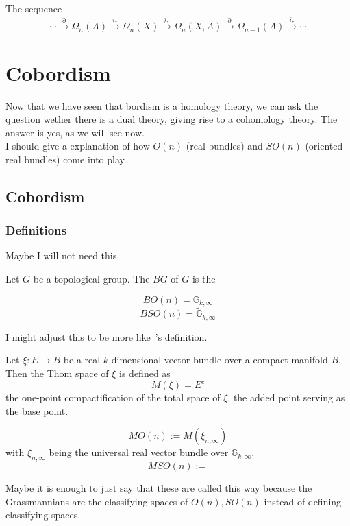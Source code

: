 \documentclass[a4paper,11pt]{article}
\begin{document}
\begin{lemma}
    The sequence
    \[\cdots\xrightarrow{\partial}\Omega_n(A)\xrightarrow{i_\ast}\Omega_n(X)\xrightarrow{j_\ast}\Omega_n(X,A)\xrightarrow{\partial}\Omega_{n-1}(A)\xrightarrow{i_\ast}\cdots\]
\end{lemma}

\section{Cobordism}
Now that we have seen that bordism is a homology theory, we can ask the question wether there is a dual theory, giving rise to a cohomology theory. The answer is yes, as we will see now.\\
I should give a explanation of how \(O(n)\) (real bundles) and \(SO(n)\) (oriented real bundles) come into play.

\subsection{Cobordism}

\subsubsection{Definitions}

Maybe I will not need this
\begin{definition}
    Let \(G\) be a topological group. The  \(BG\) of \(G\) is the 
\end{definition}

\begin{observation}
    \[BO(n)=\mathbb{G}_{k,\infty}\]
    \[BSO(n)=\widetilde{\mathbb{G}}_{k,\infty}\]
\end{observation}

I might adjust this to be more like\ \cite{thom}'s definition.
\begin{definition}
    Let \(\xi:E\to B\) be a real \(k\)-dimensional vector bundle over a compact manifold \(B\).
    Then the Thom space of \(\xi\) is defined as\[M(\xi)=E^c\] the one-point compactification of the total space of \(\xi\), the added point serving as the base point.
\end{definition}

\begin{definition}
    \[MO(n):=M(\xi_{n,\infty})\] with \(\xi_{n,\infty}\) being the universal real vector bundle over \(\mathbb{G}_{k,\infty}\).
    \[MSO(n):=  \]
\end{definition}
Maybe it is enough to just say that these are called this way because the Grassmannians are the classifying spaces of \(O(n), SO(n)\) instead of defining classifying spaces.
\end{document}

